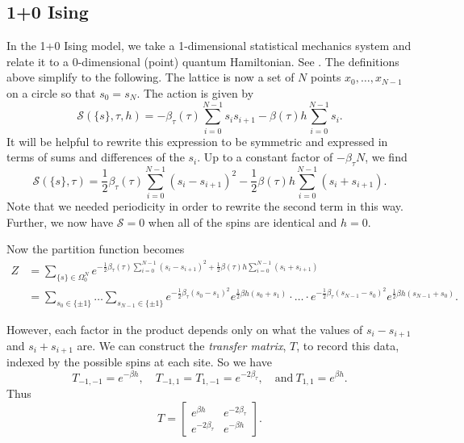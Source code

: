 \documentclass[10pt,reqno]{amsart}
\numberwithin{equation}{section}
\begin{document}
	\subsection{1+0 Ising}
	
	In the 1+0 Ising model, we take a 1-dimensional statistical mechanics system and relate it to a 0-dimensional (point) quantum Hamiltonian. See \cite{FradkinSusskind78,KogutGaugeSummary}.
	The definitions above simplify to the following. The lattice is now a set of $N$ points $x_0,\ldots,x_{N-1}$ on a circle so that $s_0=s_N$. The action is given by 
		\[\mathcal{S}(\{s\},\tau, h)=-\beta_\tau(\tau)\sum_{i=0}^{N-1} s_is_{i+1} - \beta(\tau)h\sum_{i=0}^{N-1}s_i. \] 
	It will be helpful to rewrite this expression to be symmetric and expressed in terms of sums and differences of the $s_i$. 
	Up to a constant factor of $-\beta_\tau N$, we find
		\[\mathcal{S}(\{s\},\tau)=\frac{1}{2}\beta_\tau(\tau)\sum_{i=0}^{N-1} (s_i-s_{i+1})^2 - \frac{1}{2}\beta(\tau)h\sum_{i=0}^{N-1}(s_i+s_{i+1}). \]
	Note that we needed periodicity in order to rewrite the second term in this way. Further, we now have $\mathcal{S}=0$ when all of the spins are identical and $h=0$.
	
	Now the partition function becomes 
	\begin{align*}
		Z&=\sum_{\{s\}\in\Omega_0^N} e^{-\frac{1}{2}\beta_\tau(\tau)\sum_{i=0}^{N-1} (s_i-s_{i+1})^2 + \frac{1}{2}\beta(\tau)h\sum_{i=0}^{N-1}(s_i+s_{i+1})} \\
		&=\sum_{s_0 \in \{\pm 1\}} \ldots \sum_{s_{N-1}\in \{\pm 1\}} e^{-\frac{1}{2}\beta_\tau (s_0-s_1)^2}e^{\frac{1}{2}\beta h(s_0+s_1)}\cdot\ldots\cdot e^{-\frac{1}{2}\beta_\tau (s_{N-1}-s_0)^2}e^{\frac{1}{2}\beta h(s_{N-1}+s_0)}.
	\end{align*}
	
	However, each factor in the product depends only on what the values of $s_i-s_{i+1}$ and $s_i+s_{i+1}$ are. 
	We can construct the \emph{transfer matrix}, $T$, to record this data, indexed by the possible spins at each site.
	So we have 
	\[T_{-1,-1}=e^{-\beta h}, \quad T_{-1,1}=T_{1,-1}=e^{-2\beta_\tau}, \quad \text{and}\ T_{1,1}=e^{\beta h}. \] 
	Thus \[T=\begin{bmatrix}
	e^{\beta h} & e^{-2\beta_\tau} \\
	e^{-2\beta_\tau} & e^{-\beta h}
	\end{bmatrix}. \]
	
\end{document}
